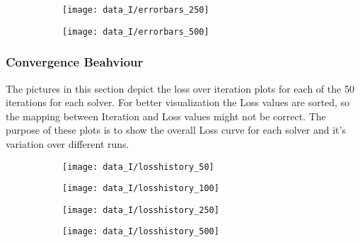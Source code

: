 \begin{figure}[h]
	\begin{subfigure}{0.5\textwidth}
		\texttt{[image: data\_I/errorbars\_250]}
		\label{fig:errorbars_250_I}
	\end{subfigure}
	\begin{subfigure}{0.5\textwidth}
		\texttt{[image: data\_I/errorbars\_500]}
		\label{fig:errorbars_500_I}
	\end{subfigure}
\end{figure}


\newpage


\subsubsection{Convergence Beahviour}

The pictures in this section depict the loss over iteration plots for each of the 50 iterations for each solver. For better visualization the Loss values are sorted, so the mapping between Iteration and Loss values might not be correct. The purpose of these plots is to show the overall Loss curve for each solver and it's variation over different runs.  

\begin{figure}[h]
	\begin{subfigure}{0.5\textwidth}
		\texttt{[image: data\_I/losshistory\_50]}
		\label{fig:losshistory_50_I}
	\end{subfigure}
	\begin{subfigure}{0.5\textwidth}
		\texttt{[image: data\_I/losshistory\_100]}
		\label{fig:losshistory_100_I}
	\end{subfigure}
\end{figure}

\begin{figure}[h]
	\begin{subfigure}{0.5\textwidth}
		\texttt{[image: data\_I/losshistory\_250]}
		\label{fig:losshistory_250_I}
	\end{subfigure}
	\begin{subfigure}{0.5\textwidth}
		\texttt{[image: data\_I/losshistory\_500]}
		\label{fig:losshistory_500_I}
	\end{subfigure}
\end{figure}